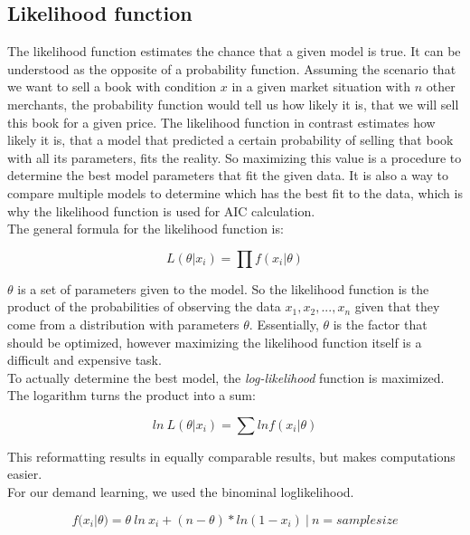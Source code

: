 \documentclass[sigconf]{acmart}
\begin{document}
\subsection*{Likelihood function}
The likelihood function estimates the chance that a given model is true. It can be understood as the opposite of a probability function. Assuming the scenario that we want to sell a book with condition $x$ in a given market situation with $n$ other merchants, the probability function would tell us how likely it is, that we will sell this book for a given price. The likelihood function in contrast estimates how likely it is, that a model that predicted a certain probability of selling that book with all its parameters, fits the reality. So maximizing this value is a procedure to determine the best model parameters that fit the given data. It is also a way to compare multiple models to determine which has the best fit to the data, which is why the likelihood function is used for AIC calculation.\\
The general formula for the likelihood function is:
\begin{center}
$$L(\theta | x_i) = \prod f(x_i|\theta)$$
\end{center}
$\theta$ is a set of parameters given to the model. So the likelihood function is the product of the probabilities of observing the data $x_1, x_2, ..., x_n$ given that they come from a distribution with parameters $\theta$. Essentially, $\theta$ is the factor that should be optimized, however maximizing the likelihood function itself is a difficult and expensive task.\\
To actually determine the best model, the \textit{log-likelihood} function is maximized. The logarithm turns the product into a sum:
\begin{center}
$$ln\ L(\theta | x_i) = \sum ln f(x_i|\theta)$$
\end{center}

This reformatting results in equally comparable results, but makes computations easier.\\
For our demand learning, we used the binominal loglikelihood.
\begin{center}
$$f(x_i|\theta) = \theta\ ln\ x_i + (n - \theta)*ln(1 - x_i)\ |\ n = samplesize$$
\end{center}
\end{document}
